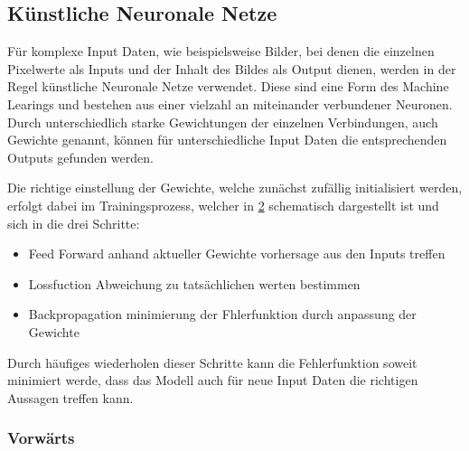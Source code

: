 
\subsection{Künstliche Neuronale Netze} \label{sec:nn}

Für komplexe Input Daten, wie beispielsweise Bilder, bei denen 
die einzelnen Pixelwerte als Inputs und der Inhalt des Bildes als 
Output dienen, werden in der Regel künstliche Neuronale Netze verwendet.
Diese sind eine Form des Machine Learings und bestehen aus einer 
vielzahl an miteinander verbundener Neuronen. Durch unterschiedlich 
starke Gewichtungen der einzelnen Verbindungen, auch Gewichte genannt, 
können für unterschiedliche Input Daten die entsprechenden Outputs 
gefunden werden.

\begin{figure}[htb]
    \centering
    \label{fig:nn}
    \def\svgwidth{0.5\columnwidth}
    \footnotesize
    
\end{figure}


Die richtige einstellung der Gewichte, welche zunächst zufällig initialisiert werden, 
erfolgt dabei im Trainingsprozess, welcher in \ref{fig:train} schematisch
 dargestellt ist und sich in die drei Schritte:
\begin{itemize}
    \item Feed Forward anhand aktueller Gewichte vorhersage aus den Inputs treffen
    \item Lossfuction Abweichung zu tatsächlichen werten bestimmen
    \item Backpropagation minimierung der Fhlerfunktion durch anpassung der Gewichte
\end{itemize}

\begin{figure}[htb]
    \centering
    \label{fig:train}
    \def\svgwidth{0.5\columnwidth}
    \footnotesize
    
\end{figure}

Durch häufiges wiederholen dieser Schritte kann die Fehlerfunktion soweit minimiert werde, 
dass das Modell auch für neue Input Daten die richtigen Aussagen treffen kann.



\subsubsection{Vorwärts}\label{subsec:percepron}


